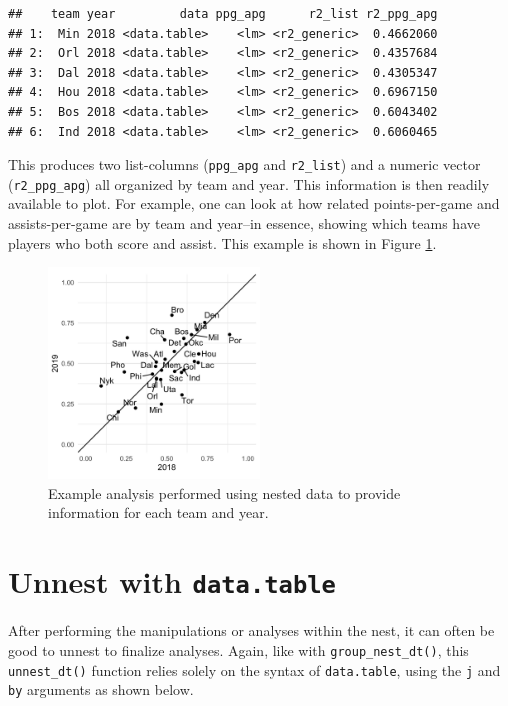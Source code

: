 \documentclass[doc,floatsintext]{apa6}
\begin{document}
\begin{verbatim}
##    team year         data ppg_apg      r2_list r2_ppg_apg
## 1:  Min 2018 <data.table>    <lm> <r2_generic>  0.4662060
## 2:  Orl 2018 <data.table>    <lm> <r2_generic>  0.4357684
## 3:  Dal 2018 <data.table>    <lm> <r2_generic>  0.4305347
## 4:  Hou 2018 <data.table>    <lm> <r2_generic>  0.6967150
## 5:  Bos 2018 <data.table>    <lm> <r2_generic>  0.6043402
## 6:  Ind 2018 <data.table>    <lm> <r2_generic>  0.6060465
\end{verbatim}

\noindent This produces two list-columns (\texttt{ppg\_apg} and \texttt{r2\_list}) and a numeric vector (\texttt{r2\_ppg\_apg}) all organized by team and year. This information is then readily available to plot. For example, one can look at how related points-per-game and assists-per-game are by team and year--in essence, showing which teams have players who both score and assist. This example is shown in Figure \ref{exfig}.

\begin{figure}[tb]
  \centering
  \includegraphics[width=0.5\textwidth]{ex_fig.png}
  \caption{Example analysis performed using nested data to provide information for each team and year.}
  \label{exfig}
\end{figure}

\hypertarget{unnest-with-data.table}{%
\section{\texorpdfstring{Unnest with \texttt{data.table}}{Unnest with data.table}}\label{unnest-with-data.table}}

After performing the manipulations or analyses within the nest, it can often be good to unnest to finalize analyses. Again, like with \texttt{group\_nest\_dt()}, this \texttt{unnest\_dt()} function relies solely on the syntax of \texttt{data.table}, using the \texttt{j} and \texttt{by} arguments as shown below.
\end{document}
